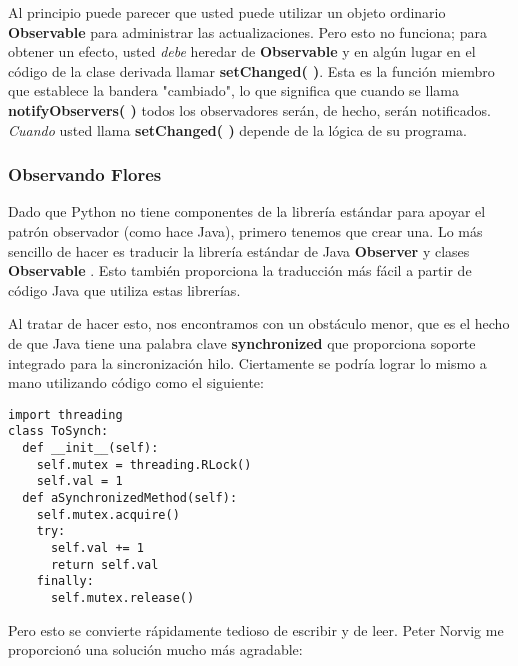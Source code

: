 Al principio puede parecer que usted puede utilizar un objeto ordinario \textbf{Observable} para administrar las actualizaciones. Pero esto no funciona; para obtener un efecto, usted \textit{debe} heredar de
\textbf{Observable} y en algún lugar en el código de la clase derivada llamar \textbf{setChanged( )}. Esta es la función miembro que establece la bandera "cambiado", lo que significa que cuando se llama \textbf{notifyObservers( )} todos los observadores serán, de hecho, serán notificados. \textit{Cuando} usted llama \textbf{setChanged( )} depende de la lógica de su programa.
 
\newpage

\subsubsection*{Observando Flores}
\label{subsubsec:of}
 

Dado que Python  no tiene componentes de la  librería estándar para apoyar el patrón observador (como hace Java), primero tenemos que crear una. Lo más sencillo de hacer es traducir la librería estándar de Java \textbf{Observer} y clases \textbf{Observable} . Esto también proporciona la traducción más fácil a partir de código Java que utiliza estas librerías.    \newline

Al tratar de hacer esto, nos encontramos con un obstáculo menor, que es el hecho de que Java tiene una palabra clave \textbf{synchronized} que proporciona soporte integrado para la sincronización hilo. Ciertamente se podría lograr lo mismo a mano utilizando código como el siguiente:\newline

\begin{lstlisting} 
import threading  
class ToSynch: 
  def __init__(self): 
    self.mutex = threading.RLock() 
    self.val = 1 
  def aSynchronizedMethod(self): 
    self.mutex.acquire() 
    try: 
      self.val += 1 
      return self.val 
    finally: 
      self.mutex.release() 
\end{lstlisting}

 Pero esto se convierte rápidamente tedioso de escribir y de leer.  Peter Norvig me proporcionó una solución mucho más agradable:     \newline
 
